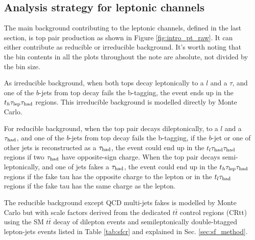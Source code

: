 \subsection{Analysis strategy for leptonic channels}

The main background contributing to the leptonic channels, defined in the last section, is top pair production as shown in Figure \ref{fig:intro_pt_raw}. It can either contribute as reducible or irreducible background. It's worth noting that
the bin contents in all the plots throughout the note are absolute, not divided by the bin size. 



As irreducible background, when both tops decay leptonically to a $l$ and a $\tau$, and one of the $b$-jets from top decay fails the b-tagging, the event ends up in the $t_h\tau_\text{lep}{}\tau_\text{had}$ regions. This irreducible background is modelled directly by Monte Carlo.

For reducible background, when the top pair decays dileptonically, to a $l$ and a $\tau_\text{had}$, and one of the $b$-jets from top decay fails the b-tagging, if the $b$-jet or one of other jets is reconstructed as a $\tau_\text{had}$, the event could end up in the $t_l\tau_\text{had}{}\tau_\text{had}$ regions if two $\tau_\text{had}$ have opposite-sign charge. When the top pair decays semi-leptonically, and one of jets fakes a $\tau_\text{had}$, the event could end up in the  $t_h\tau_\text{lep}{}\tau_\text{had}$ regions if the fake tau has the opposite charge to the lepton or in the $t_l\tau_\text{had}$ regions if the fake tau has the same charge as the lepton. 

The reducible background except QCD multi-jets fakes is modelled by Monte Carlo but with scale factors derived from the dedicated $t\bar{t}$ control regions (CRtt) using the SM
$t\bar{t}$ decay of dilepton events and semileptonically double-btagged lepton-jets events listed
in Table \ref{tab:sfcr} and explained in Sec. \ref{sec:sf_method}.

